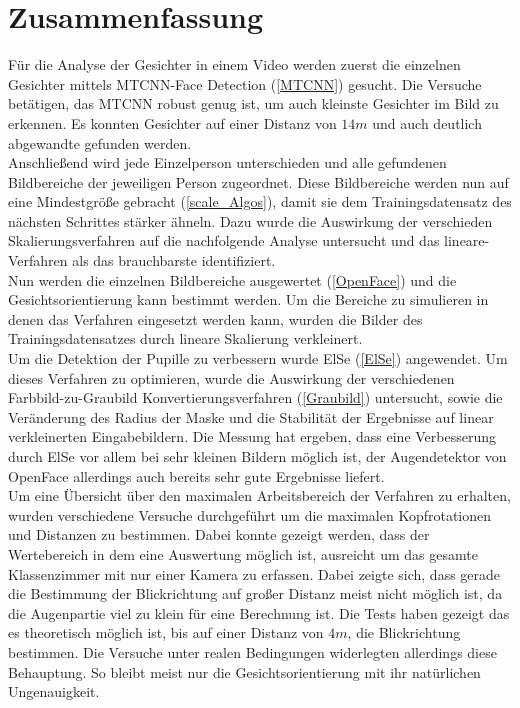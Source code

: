\section{Zusammenfassung}
Für die Analyse der Gesichter in einem Video werden zuerst die einzelnen Gesichter mittels MTCNN-Face Detection (\autoref{MTCNN}) gesucht. Die Versuche betätigen, das MTCNN robust genug ist, um auch kleinste Gesichter im Bild zu erkennen. Es konnten Gesichter auf einer Distanz von $14m$ und auch deutlich abgewandte gefunden werden.\\
Anschließend wird jede Einzelperson unterschieden und alle gefundenen Bildbereiche der jeweiligen Person zugeordnet. Diese Bildbereiche werden nun auf eine Mindestgröße gebracht (\autoref{scale_Algos}), damit sie dem Trainingsdatensatz des nächsten Schrittes stärker ähneln. Dazu wurde die Auswirkung der verschieden Skalierungsverfahren auf die nachfolgende Analyse untersucht und das lineare-Verfahren als das brauchbarste identifiziert.\\
Nun werden die einzelnen Bildbereiche ausgewertet (\autoref{OpenFace}) und die Gesichtsorientierung kann bestimmt werden. Um die Bereiche zu simulieren in denen das Verfahren eingesetzt werden kann, wurden die Bilder des Trainingsdatensatzes durch lineare Skalierung verkleinert.\\
Um die Detektion der Pupille zu verbessern wurde ElSe (\autoref{ElSe}) angewendet. Um dieses Verfahren zu optimieren, wurde die Auswirkung der verschiedenen Farbbild-zu-Graubild Konvertierungsverfahren (\autoref{Graubild}) untersucht, sowie die Veränderung des Radius der Maske und die Stabilität der Ergebnisse auf linear verkleinerten Eingabebildern. Die Messung hat ergeben, dass eine Verbesserung durch ElSe vor allem bei sehr kleinen Bildern möglich ist, der Augendetektor von OpenFace allerdings auch bereits sehr gute Ergebnisse liefert.\\
Um eine Übersicht über den maximalen Arbeitsbereich der Verfahren zu erhalten, wurden verschiedene Versuche durchgeführt um die maximalen Kopfrotationen und Distanzen zu bestimmen. Dabei konnte gezeigt werden, dass der Wertebereich in dem eine Auswertung möglich ist, ausreicht um das gesamte Klassenzimmer mit nur einer Kamera zu erfassen. Dabei zeigte sich, dass gerade die Bestimmung der Blickrichtung auf großer Distanz meist nicht möglich ist, da die Augenpartie viel zu klein für eine Berechnung ist. Die Tests haben gezeigt das es theoretisch möglich ist, bis auf einer Distanz von $4m$, die Blickrichtung bestimmen. Die Versuche unter realen Bedingungen widerlegten allerdings diese Behauptung. So bleibt meist nur die Gesichtsorientierung mit ihr natürlichen Ungenauigkeit.\\
